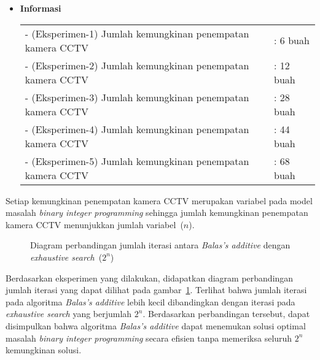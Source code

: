 \begin{itemize}
	\item \textbf{Informasi}\\
	\begin{tabular}{ll}
		- (Eksperimen-1) Jumlah kemungkinan penempatan kamera CCTV &: 6 buah\\
		- (Eksperimen-2) Jumlah kemungkinan penempatan kamera CCTV &: 12 buah\\
		- (Eksperimen-3) Jumlah kemungkinan penempatan kamera CCTV &: 28 buah\\
		- (Eksperimen-4) Jumlah kemungkinan penempatan kamera CCTV &: 44 buah\\
		- (Eksperimen-5) Jumlah kemungkinan penempatan kamera CCTV &: 68 buah\\
	\end{tabular}
\end{itemize}
Setiap kemungkinan penempatan kamera CCTV merupakan variabel pada model masalah \textit{binary integer programming} sehingga jumlah kemungkinan penempatan kamera CCTV menunjukkan jumlah variabel~(\(n\)).
\begin{figure}[H]
	\centering
	\caption[Diagram perbandingan jumlah iterasi antara \textit{Balas's additive} dengan \textit{exhaustive search}~(\(2^n\))]{Diagram perbandingan jumlah iterasi antara \textit{Balas's additive} dengan \textit{exhaustive search}~(\(2^n\))}
	\label{fig:pengujian_2}
\end{figure}

Berdasarkan eksperimen yang dilakukan, didapatkan diagram perbandingan jumlah iterasi yang dapat dilihat pada gambar~\ref{fig:pengujian_2}. Terlihat bahwa jumlah iterasi pada algoritma \textit{Balas's additive} lebih kecil dibandingkan dengan iterasi pada \textit{exhaustive search} yang berjumlah \(2^n\). Berdasarkan perbandingan tersebut, dapat disimpulkan bahwa algoritma \textit{Balas's additive} dapat menemukan solusi optimal masalah \textit{binary integer programming} secara efisien tanpa memeriksa seluruh \(2^n\) kemungkinan solusi.

